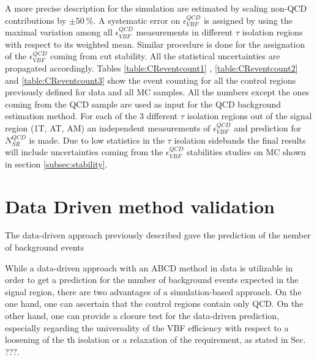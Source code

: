 A more precise description for the simulation are estimated by scaling non-QCD contributions by $\pm50~\%$. A systematic error on $\epsilon^{QCD}_{VBF}$ is assigned by using the maximal variation among all $\epsilon^{QCD}_{VBF}$ measurements in different $\tau$ isolation regions with respect to its weighted mean. Similar procedure is done for the assignation of the $\epsilon^{QCD}_{VBF}$ coming from \met cut stability. All the statistical uncertainties are propagated accordingly. Tables \ref{table:CReventcount1} , \ref{table:CReventcount2} and \ref{table:CReventcount3} show the event counting for all the control regions previously defined for data and all MC samples. All the numbers except the ones coming from the QCD sample are used as input for the QCD background estimation method. For each of the 3 different $\tau$ isolation regions out of the signal region (1T, AT, AM) an independent measurements of $\epsilon^{QCD}_{VBF}$  and prediction for $N^{QCD}_{SR}$ is made. Due to low statistics in the $\tau$ isolation sidebands the final results will include uncertainties coming from the $\epsilon^{QCD}_{VBF}$ stabilities studies on MC shown in section \ref{subsec:stability}.

\clearpage

\section{Data Driven method validation}
\label{QCD_bg_pred_validation}

The data-driven approach previously described gave the prediction of the nember of background events 

While a data-driven approach with an ABCD method in data is utilizable in order to get a prediction for the number of background events expected in the signal region, there are two advantages of a simulation-based approach. On the one hand, one can ascertain that the control regions contain only QCD. On the other hand, one can provide a closure test for the data-driven prediction, especially regarding the universality of the VBF efficiency with respect to a loosening of the τh isolation or a relaxation of the \met requirement, as stated in Sec. ???.

